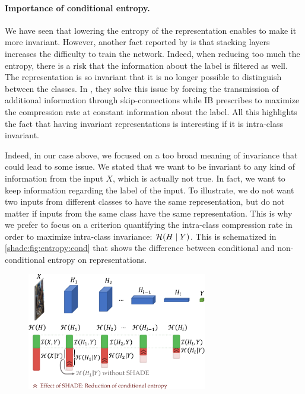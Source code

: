     \paragraph{Importance of conditional entropy.}
        We have seen that lowering the entropy of the representation enables to make it more invariant. However, another fact reported by \citet{resnet} is that stacking layers increases the difficulty to train the network. Indeed, when reducing too much the entropy, there is a risk that the information about the label is filtered as well.  The representation is so invariant that it is no longer possible to distinguish between the classes.
        In \citet{resnet}, they solve this issue by forcing the transmission of additional information through skip-connections while IB prescribes to maximize the compression rate at constant information about the label. All this highlights the fact that having invariant representations is interesting if it is intra-class invariant.

        Indeed, in our case above, we focused on a too broad meaning of invariance that could lead to some issue. We stated that we want to be invariant to any kind of information from the input $X$, which is actually not true.        
        In fact, we want to keep information regarding the label of the input. To illustrate, we do not want two inputs from different classes to have the same representation, but do not matter if inputs from the same class have the same representation. This is why we prefer to focus on a criterion quantifying the intra-class compression rate in order to maximize intra-class invariance: $\mathcal{H}(H\mid Y)$. This is schematized in \autoref{shade:fig:entropy:cond} that shows the difference between conditional and non-conditional entropy on representations.
        
        \begin{figure}[tbp]%
            \centering
            \includegraphics[width=0.7\textwidth]{images/shade_motivation}
            \label{shade:fig:motivation}
        \end{figure}    

